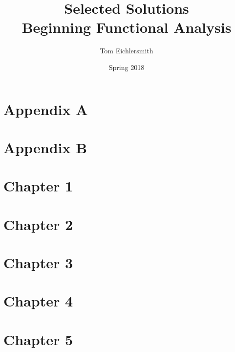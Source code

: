 \documentclass{article}
\title{Selected Solutions \\ Beginning Functional Analysis}
\author{Tom Eichlersmith}
\date{Spring 2018}
\begin{document}
    \maketitle

    \section*{Appendix A}

    

    \section*{Appendix B}

    

    \section*{Chapter 1}

    

    \section*{Chapter 2}

    

    \section*{Chapter 3}

    

    \section*{Chapter 4}

    

    \section*{Chapter 5}

    
\end{document}
